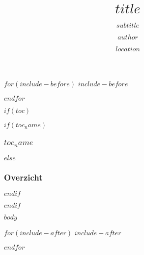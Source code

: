 \documentclass[
  hyperref={colorlinks=true,citecolor=link.colour,linkcolor=link.colour,urlcolor=link.colour},
  $if(fontsize)$$fontsize$$else$10pt$endif$,
  xetex,
  noamsthm$if(handout)$, handout$endif$$if(aspect)$, aspectratio=$aspect$ $endif$
]{beamer}
\title{$title$}
\subtitle{$subtitle$}
\author{$author$}
\institute{$institute$}
\date{$location$}
\date{}
\begin{document}
\begin{frame}[plain, label=intro, noframenumbering]
  \titlepage
\end{frame}

$for(include-before)$
$include-before$

$endfor$

$if(toc)$
\begin{frame}
$if(toc_name)$
  \frametitle{$toc_name$}
$else$
  \frametitle{Overzicht}
$endif$
	\tableofcontents
\end{frame}
$endif$

$body$

$for(include-after)$
$include-after$

$endfor$
\end{document}
